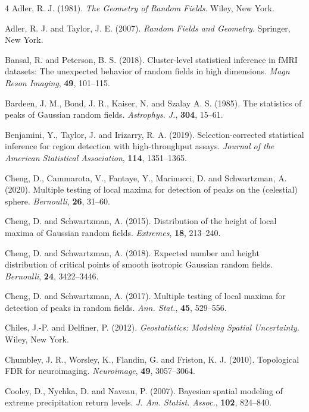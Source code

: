 \documentclass[aap,preprint]{imsart}
\theoremstyle{plain}
\theoremstyle{definition}
\begin{document}
	\begin{thebibliography}{4}
		Adler, R. J. (1981). {\it The Geometry of Random Fields}. Wiley,
		New York.
		
		Adler, R. J. and Taylor, J. E. (2007). {\it Random Fields and Geometry}. Springer, New York.
		
		Bansal, R. and Peterson, B. S. (2018). Cluster-level statistical inference in fMRI datasets: The unexpected behavior of random fields in high dimensions. {\it Magn Reson Imaging},
		{\bf 49},  101--115.
		
		Bardeen, J. M., Bond, J. R., Kaiser, N. and Szalay A. S. (1985). The statistics of peaks of Gaussian random fields. {\it Astrophys. J.},
		{\bf 304},  15--61.
		
		Benjamini, Y., Taylor, J. and Irizarry, R. A. (2019). Selection-corrected statistical inference for region detection with high-throughput assays. \emph{Journal of the American Statistical Association}, {\bf 114}, 1351--1365.
		
		Cheng, D., Cammarota, V., Fantaye, Y., Marinucci, D. and Schwartzman, A. (2020). Multiple testing of local maxima for detection of peaks on the (celestial) sphere. {\it Bernoulli}, {\bf 26},  31--60.
		
		Cheng, D. and Schwartzman, A. (2015). Distribution of the height of local maxima of Gaussian random fields. {\it Extremes}, {\bf 18}, 213--240.
		
		Cheng, D. and Schwartzman, A. (2018). Expected number and height distribution of critical points of smooth isotropic Gaussian random fields. {\it Bernoulli}, {\bf 24}, 3422--3446.
		
		Cheng, D. and Schwartzman, A. (2017). Multiple testing of local maxima for detection of peaks in random fields. {\it Ann. Stat.}, {\bf 45}, 529--556.
		
		Chiles, J.-P. and Delfiner, P. (2012). {\it Geostatistics: Modeling Spatial Uncertainty}. Wiley, New York.
		
		Chumbley, J. R., Worsley, K., Flandin, G. and Friston, K. J. (2010). Topological FDR for neuroimaging.
		\emph{Neuroimage}, {\bf 49}, 3057--3064.
		
		Cooley, D., Nychka, D. and Naveau, P. (2007). Bayesian spatial modeling of extreme precipitation return levels. \emph{J. Am. Statist. Assoc.}, {\bf 102}, 824--840.
		

\end{thebibliography}
\end{document}
